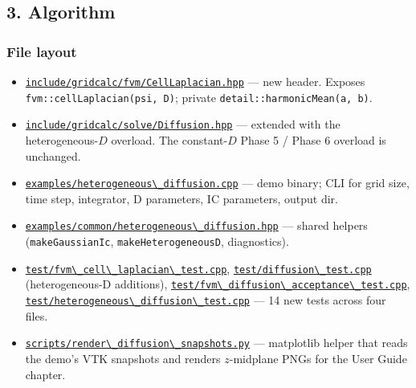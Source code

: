 \subsection{3. Algorithm}\label{phase14-algorithm}

\subsubsection{File layout}\label{phase14-files}

\begin{itemize}
\tightlist
\item
  \href{../../../include/gridcalc/fvm/CellLaplacian.hpp}{\passthrough{\lstinline!include/gridcalc/fvm/CellLaplacian.hpp!}}
  --- new header. Exposes
  \passthrough{\lstinline!fvm::cellLaplacian(psi, D)!}; private
  \passthrough{\lstinline!detail::harmonicMean(a, b)!}.
\item
  \href{../../../include/gridcalc/solve/Diffusion.hpp}{\passthrough{\lstinline!include/gridcalc/solve/Diffusion.hpp!}}
  --- extended with the heterogeneous-\(D\) overload. The constant-\(D\)
  Phase 5 / Phase 6 overload is unchanged.
\item
  \href{../../../examples/heterogeneous_diffusion.cpp}{\passthrough{\lstinline!examples/heterogeneous\_diffusion.cpp!}}
  --- demo binary; CLI for grid size, time step, integrator, D
  parameters, IC parameters, output dir.
\item
  \href{../../../examples/common/heterogeneous_diffusion.hpp}{\passthrough{\lstinline!examples/common/heterogeneous\_diffusion.hpp!}}
  --- shared helpers
  (\passthrough{\lstinline!makeGaussianIc!},
  \passthrough{\lstinline!makeHeterogeneousD!},
  diagnostics).
\item
  \href{../../../test/fvm_cell_laplacian_test.cpp}{\passthrough{\lstinline!test/fvm\_cell\_laplacian\_test.cpp!}},
  \href{../../../test/diffusion_test.cpp}{\passthrough{\lstinline!test/diffusion\_test.cpp!}}
  (heterogeneous-D additions),
  \href{../../../test/fvm_diffusion_acceptance_test.cpp}{\passthrough{\lstinline!test/fvm\_diffusion\_acceptance\_test.cpp!}},
  \href{../../../test/heterogeneous_diffusion_test.cpp}{\passthrough{\lstinline!test/heterogeneous\_diffusion\_test.cpp!}}
  --- 14 new tests across four files.
\item
  \href{../../../scripts/render_diffusion_snapshots.py}{\passthrough{\lstinline!scripts/render\_diffusion\_snapshots.py!}}
  --- matplotlib helper that reads the demo's VTK snapshots and
  renders \(z\)-midplane PNGs for the User Guide chapter.
\end{itemize}


